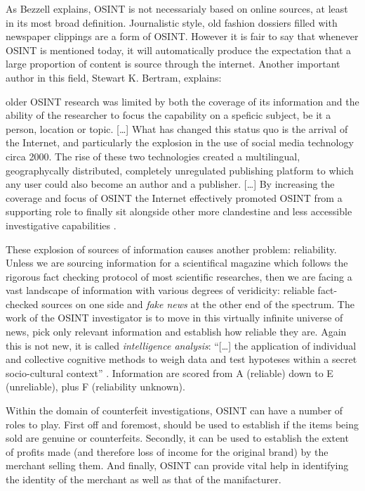 As Bezzell explains, OSINT is not necessarialy based on online sources, at least
in its most broad definition. Journalistic style, old fashion dossiers filled
with newspaper clippings are a form of OSINT. However it is fair to say that
whenever OSINT is mentioned today, it will automatically produce the expectation
that a large proportion of content is source through the internet. Another
important author in this field, Stewart K. Bertram, explains:
\begin{displayquote}
older OSINT research was limited by both the coverage of its information and the
ability of the researcher to focus the capability on a speficic subject, be it
a person, location or topic. [\ldots] What has changed this status quo is the
arrival of the Internet, and particularly the explosion in the use of social
media technology circa 2000. The rise of these two technologies created a
multilingual, geographycally distributed, completely unregulated publishing
platform to which any user could also become an author and a publisher. [\ldots]
By increasing the coverage and focus of OSINT the Internet effectively promoted
OSINT from a supporting role to finally sit alongside other more clandestine and
less accessible investigative capabilities \cite{SB15}.
\end{displayquote}

These explosion of sources of information causes another problem: reliability.
Unless we are sourcing information for a scientifical magazine which
follows the rigorous fact checking protocol of most scientific researches, then
we are facing a vast landscape of information with various degrees of
veridicity: reliable fact-checked sources on one side and \emph{fake news} at
the other end of the spectrum. The work of the OSINT investigator is to move in
this virtually infinite universe of news, pick only relevant information and
establish how reliable they are. Again this is not new, it is called
\emph{intelligence analysis}: ``[\ldots] the application of individual and
collective cognitive methods to weigh data and test hypoteses within a secret
socio-cultural context'' \cite{JH07}. Information
are scored from A (reliable) down to E (unreliable), plus F (reliability
unknown).

Within the domain of counterfeit investigations, OSINT can have a number of
roles to play. First off and foremost, should be used to establish if the items
being sold are genuine or counterfeits. Secondly, it can be used to establish
the extent of profits made (and therefore loss of income for the original brand)
by the merchant selling them. And finally, OSINT can provide vital help in
identifying the identity of the merchant as well as that of the manifacturer.


